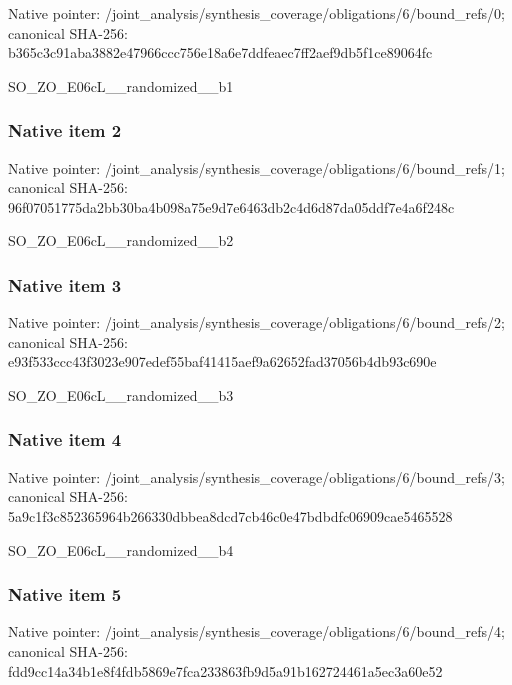 \documentclass[10pt,a4paper]{article}
\begin{document}
Native pointer: /joint\_analysis/synthesi\allowbreak{}s\_coverage/obligations/6\allowbreak{}/bound\_refs/0; canonical SHA-256: b365c3c91aba3882e47966cc\allowbreak{}c756e18a6e7ddfeaec7ff2ae\allowbreak{}f9db5f1ce89064fc


SO\_ZO\_E06cL\_\_randomized\_\_b1


\subsubsection{Native item 2}


Native pointer: /joint\_analysis/synthesi\allowbreak{}s\_coverage/obligations/6\allowbreak{}/bound\_refs/1; canonical SHA-256: 96f07051775da2bb30ba4b09\allowbreak{}8a75e9d7e6463db2c4d6d87d\allowbreak{}a05ddf7e4a6f248c


SO\_ZO\_E06cL\_\_randomized\_\_b2


\subsubsection{Native item 3}


Native pointer: /joint\_analysis/synthesi\allowbreak{}s\_coverage/obligations/6\allowbreak{}/bound\_refs/2; canonical SHA-256: e93f533ccc43f3023e907ede\allowbreak{}f55baf41415aef9a62652fad\allowbreak{}37056b4db93c690e


SO\_ZO\_E06cL\_\_randomized\_\_b3


\subsubsection{Native item 4}


Native pointer: /joint\_analysis/synthesi\allowbreak{}s\_coverage/obligations/6\allowbreak{}/bound\_refs/3; canonical SHA-256: 5a9c1f3c852365964b266330\allowbreak{}dbbea8dcd7cb46c0e47bdbdf\allowbreak{}c06909cae5465528


SO\_ZO\_E06cL\_\_randomized\_\_b4


\subsubsection{Native item 5}


Native pointer: /joint\_analysis/synthesi\allowbreak{}s\_coverage/obligations/6\allowbreak{}/bound\_refs/4; canonical SHA-256: fdd9cc14a34b1e8f4fdb5869\allowbreak{}e7fca233863fb9d5a91b1627\allowbreak{}24461a5ec3a60e52
\end{document}
